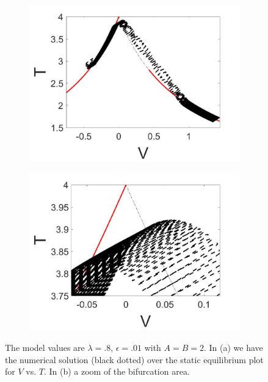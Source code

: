 \begin{figure}[H]
\centering
\begin{subfigure}{.5\textwidth}
 \centering
 \includegraphics[width=\linewidth]{twoD/slowosc_Tplot_small.jpg}
 \caption{}
\end{subfigure}%
\begin{subfigure}{.5\textwidth}
 \centering
 \includegraphics[width=\linewidth]{twoD/slowosc_Tplot_small_zoom.jpg}
 \caption{}
\end{subfigure}
\caption{The model values are $\lambda=.8$, $\epsilon=.01$ with $A=B=2$. In (a) we have the numerical solution (black dotted) over the static equilibrium plot for $V$ vs. $T$. In (b) a zoom of the bifurcation area.}
\label{fig:twoD_slowosc_Tnumerics_small}
\end{figure}

